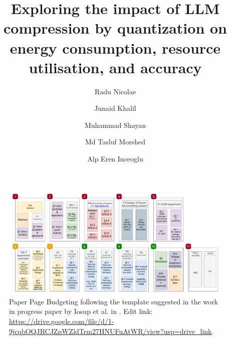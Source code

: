 \documentclass[sigconf,review]{acmart}
\begin{document}
\begin{figure}
    \centering
    \includegraphics[width=0.95\linewidth]{reportTemplate/figures/paper-page-budgeting-green-lab.pdf}
    \caption{Paper Page Budgeting following the template suggested in the work in progress paper by Iosup et al. in \cite{iosup-epema-systems-writing-wip}. Edit link: \url{https://drive.google.com/file/d/1-9jcqbOQJRCJZpWZldTrm27HNUFuAtWR/view?usp=drive_link}.}
    \label{fig:placeholder}
\end{figure}

\newpage

\title{
Exploring the impact of LLM compression by quantization on energy consumption, resource utilisation, and accuracy
}

\author{Radu Nicolae}
 

\author{Junaid Khalil}
 

\author{Muhammad Shayan}
 

\author{Md Tasluf Morshed}
 

\author{Alp Eren Inceoglu}
 
\end{document}
